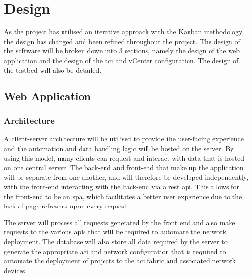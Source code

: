 \chapter{Design}
\label{chap:design}
As the project has utilised an iterative
approach with the Kanban methodology, the design has changed and been refined
throughout the project. The design of the software will be broken down into 3
sections, namely the design of the web application and the design of the \gls{aci}
and vCenter configuration.
The design of the testbed will also be detailed.

\section{Web Application}
\label{design:web-application}
\subsection{Architecture}
\label{design:web-application:architecture}

A client-server architecture will be utilised to provide the user-facing
experience and the automation and data handling logic will be hosted on the server. By
using this model, many clients can request and interact with data that is
hosted on one central server. The back-end and front-end that make up the
application will be separate from one another, and will therefore be developed
independently, with the front-end interacting with the back-end via a \gls{rest} \gls{api}.
This allows for the front-end to be an \gls{spa}, which facilitates a better user
experience due to the lack of page refreshes upon every request.

The server
will process all requests generated by the front end and also make requests to
the various \gls{api}s that will be required to automate the network deployment. The database will also store all data required by the server to generate the
appropriate \gls{aci} and network configuration that is required to automate the deployment
of projects to the \gls{aci} fabric and associated network devices.

